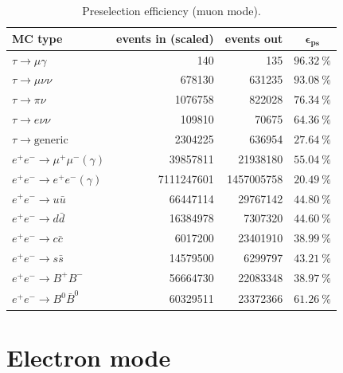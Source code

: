 \documentclass[12pt]{thesis}  %
\begin{document}
\begin{table}[h]
\centering
\begin{tabular}{lrrc}
\textbf{MC type}         & \textbf{events in (scaled)} & \textbf{events out} & $\mathbf{\epsilon_{\text{ps}}}$ \\ \hline 
\rowcolor[HTML]{EFEFEF} 
$\tau\to\mu\gamma$       & \num{140}        & \num{135}      & $\SI{96.32}{\percent}$                   \\
$\tau\to\mu\nu\nu$      & \num{678130}         & \num{631235}          & $\SI{93.08}{\percent}$           \\
$\tau\to\pi\nu$         & \num{1076758}       & \num{822028}          & $\SI{76.34}{\percent}$            \\
$\tau\to e\nu\nu$       & \num{109810}        & \num{70675}         & $\SI{64.36}{\percent}$      \\
$\tau\to\text{generic}$  & \num{2304225}       & \num{636954}          & $\SI{27.64}{\percent}$         \\
$e^+ e^- \to \mu^+ \mu^- (\gamma)$   & \num{39857811}    & \num{21938180}     & $\SI{55.04}{\percent}$   \\
$e^+ e^- \to e^+ e^- (\gamma)$      & \num{7111247601}      & \num{1457005758}       & $\SI{20.49}{\percent}$     \\
$e^+ e^- \to u \bar{u}$       & \num{66447114}           & \num{29767142}  & $\SI{44.80}{\percent}$ \\
$e^+ e^- \to d \bar{d}$        & \num{16384978}       & \num{7307320}      & $\SI{44.60}{\percent}$       \\
$e^+ e^- \to c \bar{c}$        & \num{6017200}       & \num{23401910}           & $\SI{38.99}{\percent}$          \\
$e^+ e^- \to s \bar{s}$       & \num{14579500}     & \num{6299797}            & $\SI{43.21}{\percent}$         \\
$e^+ e^- \to B^+ B^-$     & \num{56664730}       & \num{22083348}           & $\SI{38.97}{\percent}$          \\
$e^+ e^- \to B^0 \bar{B}^0$       & \num{60329511}           & \num{23372366}        & $\SI{61.26}{\percent}$              
\end{tabular}
\caption{Preselection efficiency (muon mode).}
\label{tab:preselection events muon mode}
\end{table}


\section{Electron mode}
\end{document}
